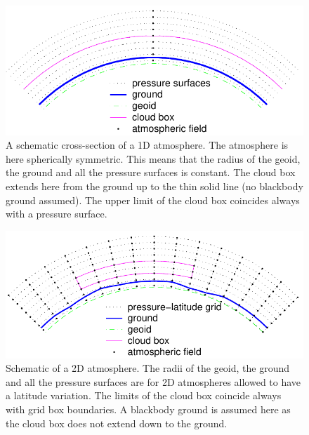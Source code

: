 \begin{figure}[!t]
 \begin{center}
  \includegraphics*[width=0.95\hsize]{Figs/fm_definitions/atm_dim_1d}
  \caption{A schematic cross-section of a 1D atmosphere. The atmosphere is 
    here spherically symmetric. This means that the radius of the
    geoid, the ground and all the pressure surfaces is constant. The
    cloud box extends here from the ground up to the thin solid line
    (no blackbody ground assumed). The upper limit of the cloud box
    coincides always with a pressure surface. }
  \label{fig:fm_defs:1d}  
 \end{center}
\end{figure}

\begin{figure}[!t]
 \begin{center}
  \includegraphics*[width=0.95\hsize]{Figs/fm_definitions/atm_dim_2d}
  \caption{ Schematic of a 2D atmosphere. The radii of the geoid, the ground
    and all the pressure surfaces are for 2D atmospheres allowed to
    have a latitude variation. The limits of the cloud box coincide
    always with grid box boundaries. A blackbody ground is assumed
    here as the cloud box does not extend down to the ground. }
  \label{fig:fm_defs:2d}
 \end{center}
\end{figure}


